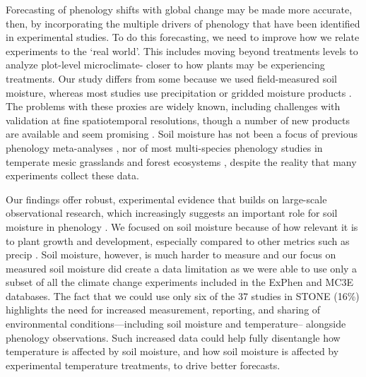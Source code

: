 \documentclass{article}
\begin{document}
\par Forecasting of phenology shifts with global change may be made more accurate, then, by incorporating the multiple drivers of phenology that have been identified in experimental studies. To do this forecasting, we need to improve how we relate experiments to the `real world'. This includes moving beyond treatments levels to analyze plot-level microclimate- closer to how plants may be experiencing treatments. Our study differs from some because we used field-measured soil moisture, whereas most studies use precipitation \citep[e.g.,][]{tao2020} or gridded moisture products \citep[e.g.,][]{tao2019}. The problems with these proxies are widely known, including challenges with validation at fine spatiotemporal resolutions, though a number of new products are available and seem promising \citep{peng2021roadmap,brocca2024exploring}. Soil moisture has not been a focus of previous phenology meta-analyses \cite[e.g.,][]{wolkovich2012,stuble2021plant,zhou2023climate}, nor of most multi-species phenology studies in temperate mesic grasslands and forest ecosystems \cite[e.g.,][]{Vitass2021}, despite the reality that many experiments collect these data.

\par Our findings offer robust, experimental evidence that builds on large-scale observational research, which increasingly suggests an important role for soil moisture in phenology \cite[e.g.,][]{luo2021response}. We focused on soil moisture because of how relevant it is to plant growth and development, especially compared to other metrics such as precip \cite{campanella2020environmental,cui2022influences, zhang2023effects}. Soil moisture, however, is much harder to measure and our focus on measured soil moisture did create a data limitation as we were able to use only a subset of all the climate change experiments included in the ExPhen and MC3E databases. The fact that we could use only six of the 37 studies in STONE (16\%) highlights the need for increased  measurement, reporting, and sharing of environmental conditions---including soil moisture and temperature-- alongside phenology observations. Such increased data could help fully disentangle how temperature is affected by soil moisture, and how soil moisture is affected by experimental temperature treatments, to drive better forecasts.
\end{document}
